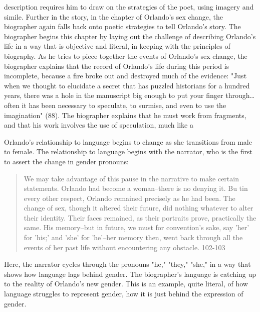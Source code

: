 \documentclass[11pt]{article}
\begin{document}
description requires him to draw on the strategies of the poet, using
imagery and simile. Further in the story, in the chapter of Orlando's
sex change, the biographer again falls back onto poetic strategies to
tell Orlando's story. The biographer begins this chapter by laying out
the challenge of describing Orlando's life in a way that is objective
and literal, in keeping with the principles of biography. As he tries
to piece together the events of Orlando's sex change, the biographer
explains that the record of Orlando’s life during this period is
incomplete, because a fire broke out and destroyed much of the
evidence: "Just when we thought to elucidate a secret that has puzzled
historians for a hundred years, there was a hole in the manuscript big
enough to put your finger through\ldots{} often it has been necessary to
speculate, to surmise, and even to use the imagination" (88). The
biographer explains that he must work from fragments, and that his
work involves the use of speculation, much like a 

Orlando's relationship to language begins to change as she transitions
from male to female. The relationship to language begins with the
narrator, who is the first to assert the change in gender pronouns:
\begin{quote}
We may take advantage of this pause in the narrative to make certain
statements. Orlando had become a woman--there is no denying it. Bu tin
every other respect, Orlando remained precisely as he had been. The
change of sex, though it altered their future, did nothing whatever to
alter their identity. Their faces remained, as their portraits prove,
practically the same. His memory--but in future, we must for
convention's sake, say 'her' for 'his;' and 'she' for 'he'--her memory
then, went back through all the events of her past life without
encountering any obstacle. 102-103
\end{quote}
Here, the narrator cycles through the pronouns "he," "they," "she," in
a way that shows how language lags behind gender. The biographer's
language is catching up to the reality of Orlando's new gender. This
is an example, quite literal, of how language struggles to represent
gender, how it is just behind the expression of gender.
\end{document}

